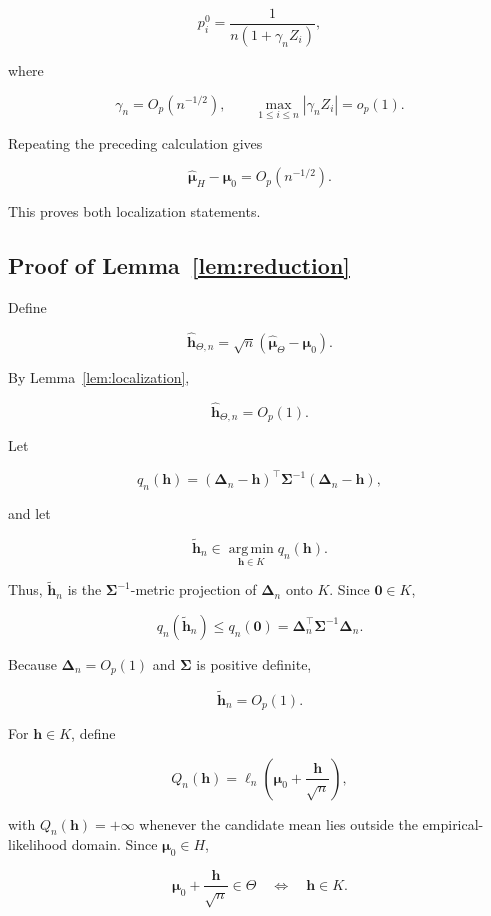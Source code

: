 \documentclass[11pt]{article}
\theoremstyle{remark}
\newcommand{\argmin}{\operatorname*{arg\,min}}
\begin{document}
$$ p_i^0=\frac{1}{n(1+\gamma_nZ_i)}, $$

where

$$ \gamma_n=O_p(n^{-1/2}),\qquad \max_{1\leq i\leq n}|\gamma_nZ_i|=o_p(1). $$

Repeating the preceding calculation gives

$$ \widehat{\boldsymbol{\mu}}_H-\boldsymbol{\mu}_0=O_p(n^{-1/2}). $$

This proves both localization statements.

\subsection{Proof of Lemma~\ref{lem:reduction}}

Define

$$ \widehat{\boldsymbol{h}}_{\Theta,n}=\sqrt{n}\left(\widehat{\boldsymbol{\mu}}_\Theta-\boldsymbol{\mu}_0\right). $$

By Lemma~\ref{lem:localization},

$$ \widehat{\boldsymbol{h}}_{\Theta,n}=O_p(1). $$

Let

$$ q_n(\boldsymbol{h})=(\boldsymbol{\Delta}_n-\boldsymbol{h})^\top\boldsymbol{\Sigma}^{-1}(\boldsymbol{\Delta}_n-\boldsymbol{h}), $$

and let

$$ \widetilde{\boldsymbol{h}}_n\in\argmin_{\boldsymbol{h}\in K}q_n(\boldsymbol{h}). $$

Thus, $\widetilde{\boldsymbol{h}}_n$ is the $\boldsymbol{\Sigma}^{-1}$-metric projection of $\boldsymbol{\Delta}_n$ onto $K$. Since $\boldsymbol{0}\in K$,

$$ q_n(\widetilde{\boldsymbol{h}}_n)\leq q_n(\boldsymbol{0})=\boldsymbol{\Delta}_n^\top\boldsymbol{\Sigma}^{-1}\boldsymbol{\Delta}_n. $$

Because $\boldsymbol{\Delta}_n=O_p(1)$ and $\boldsymbol{\Sigma}$ is positive definite,

$$ \widetilde{\boldsymbol{h}}_n=O_p(1). $$

For $\boldsymbol{h}\in K$, define

$$ Q_n(\boldsymbol{h})=\ell_n\left(\boldsymbol{\mu}_0+\frac{\boldsymbol{h}}{\sqrt{n}}\right), $$

with $Q_n(\boldsymbol{h})=+\infty$ whenever the candidate mean lies outside the empirical-likelihood domain. Since $\boldsymbol{\mu}_0\in H$,

$$ \boldsymbol{\mu}_0+\frac{\boldsymbol{h}}{\sqrt{n}}\in\Theta\quad\Longleftrightarrow\quad\boldsymbol{h}\in K. $$
\end{document}

